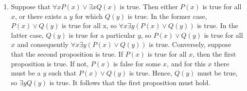 \documentclass{sig-alternate-05-2015}
\begin{document}
\begin{enumerate}
\item Suppose that $\forall x P(x) \vee \exists x Q(x)$ is
true. Then either $P(x)$ is true for all $x$, or there exists a $y$ for
which $Q(y)$ is true. In the former case, $P(x) \vee Q(y)$ is true
for all x, so $\forall x \exists y (P(x) \vee Q(y))$ is true. In the latter case,
$Q(y)$ is true for a particular $y$, so $P(x) \vee Q(y)$ is true for all
$x$ and consequently $\forall x \exists y(P(x) \vee Q(y))$ is true. Conversely,
suppose that the second proposition is true. If $P(x)$ is true for
all $x$, then the first proposition is true. If not, $P(x)$ is false for
some $x$, and for this $x$ there must be a $y$ such that $P(x) \vee Q(y)$
is true. Hence, $Q(y)$ must be true, so $\exists y Q(y)$ is true. It follows
that the first proposition must hold.
\end{enumerate}
\end{document}
